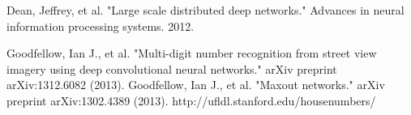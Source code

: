 \documentclass[conference]{IEEEtran}
\begin{document}
%
%
%
\begin{thebibliography}{1}

Dean, Jeffrey, et al. "Large scale distributed deep networks." Advances in neural information processing systems. 2012.



Goodfellow, Ian J., et al. "Multi-digit number recognition from street view imagery using deep convolutional neural networks." arXiv preprint arXiv:1312.6082 (2013).
Goodfellow, Ian J., et al. "Maxout networks." arXiv preprint arXiv:1302.4389 (2013).
http://ufldl.stanford.edu/housenumbers/



\end{thebibliography}




\end{document}
